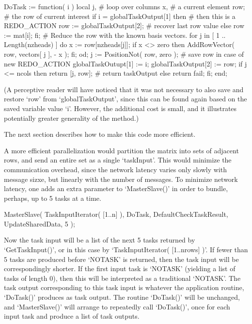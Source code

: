 \beginexample
  DoTask := function( i )
      local j,         # loop over columns
            x,         # a current element
            row;       # the row of current interest
    if i = globalTaskOutput[1] then
      # then this is a REDO_ACTION
      row := globalTaskOutput[2]; # recover last row value
    else row := mat[i];
    fi;
    # Reduce the row with the known basis vectors.
    for j in [ 1 .. Length(nzheads) ] do
      x := row[nzheads[j]];
      if x <> zero then
        AddRowVector( row, vectors[ j ], - x );
      fi;
    od;
    j := PositionNot( row, zero );
    # save row in case of new REDO_ACTION
    globalTaskOutupt[1] := i;
    globalTaskOutput[2] := row;
    if j <= ncols then return [j, row]; # return taskOutput
    else return fail; fi;
  end;
\endexample

(A perceptive reader will have noticed that it was not necessary to
also save and restore `row' from `globalTaskOutput', since this can
be found again based on the saved variable value `i'.  However, the
additional cost is small, and it illustrates potentially greater
generality of the method.)

The next section describes how to make this code more efficient.



A more efficient parallelization would partition the matrix into sets
of adjacent rows, and send an entire set as a single `taskInput'.
This would minimize the communication overhead, since the network latency
varies only slowly with message sizxe, but linearly with the number
of messages.  To minimize network latency, one adds an extra parameter
to `MasterSlave()' in order to bundle, perhaps, up to 5 tasks at a time.

\beginexample
    MasterSlave( TaskInputIterator( [1..n] ), DoTask, DefaultCheckTaskResult,
                  UpdateSharedData, 5 );
\endexample

Now the task input will be a list of the next 5 tasks returned by
`GetTaskInput()', or in this case by `TaskInputIterator( [1..nrows] )'.
If fewer than 5 tasks are produced before `NOTASK' is returned, then
the task input will be correspondingly shorter.  If the first input
task is `NOTASK' (yielding a list of tasks of length 0), then this
will be interpreted as a traditional `NOTASK'.  The task output
corresponding to this task input is whatever the application routine,
`DoTask()' produces as task output.  The routine `DoTask()' will be
unchanged, and `MasterSlave()' will arrange to repeatedly call
`DoTask()', once for each input task and produce a list of task
outputs.

